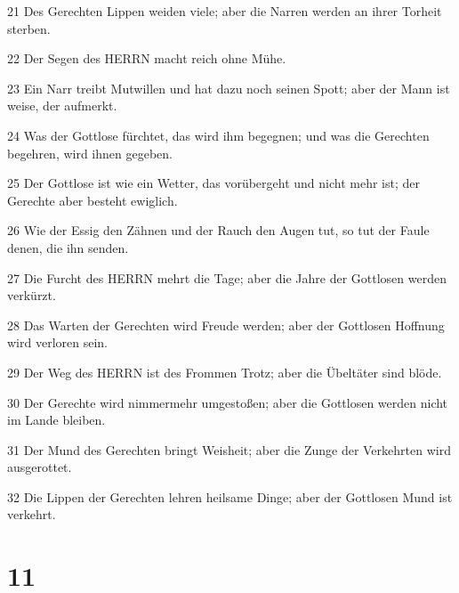 \par 21 Des Gerechten Lippen weiden viele; aber die Narren werden an ihrer Torheit sterben.
\par 22 Der Segen des HERRN macht reich ohne Mühe.
\par 23 Ein Narr treibt Mutwillen und hat dazu noch seinen Spott; aber der Mann ist weise, der aufmerkt.
\par 24 Was der Gottlose fürchtet, das wird ihm begegnen; und was die Gerechten begehren, wird ihnen gegeben.
\par 25 Der Gottlose ist wie ein Wetter, das vorübergeht und nicht mehr ist; der Gerechte aber besteht ewiglich.
\par 26 Wie der Essig den Zähnen und der Rauch den Augen tut, so tut der Faule denen, die ihn senden.
\par 27 Die Furcht des HERRN mehrt die Tage; aber die Jahre der Gottlosen werden verkürzt.
\par 28 Das Warten der Gerechten wird Freude werden; aber der Gottlosen Hoffnung wird verloren sein.
\par 29 Der Weg des HERRN ist des Frommen Trotz; aber die Übeltäter sind blöde.
\par 30 Der Gerechte wird nimmermehr umgestoßen; aber die Gottlosen werden nicht im Lande bleiben.
\par 31 Der Mund des Gerechten bringt Weisheit; aber die Zunge der Verkehrten wird ausgerottet.
\par 32 Die Lippen der Gerechten lehren heilsame Dinge; aber der Gottlosen Mund ist verkehrt.

\chapter{11}


